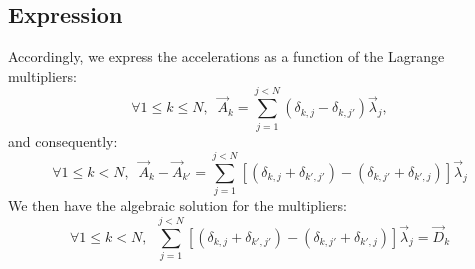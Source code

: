 \documentclass[aps,12pt]{revtex4}
\begin{document}
\subsection{Expression}
Accordingly, we express the accelerations as a function of the Lagrange multipliers:
\begin{equation}
	\forall 1\leq k \leq N, \;\; \vec{A}_k = \sum_{j=1}^{j<N} \left( \delta_{k,j} - \delta_{k,j'}\right) \vec{\lambda}_j,
\end{equation}
and consequently:
\begin{equation}
	\forall 1\leq k < N, \;\; \vec{A}_k - \vec{A}_{k'}
	= \sum_{j=1}^{j<N} \left[ 
	\left(\delta_{k,j}+\delta_{k',j'} \right) 
	- \left(\delta_{k,j'}+\delta_{k',j}\right)
	\right] \vec{\lambda}_j
\end{equation}
We then have the algebraic solution for the multipliers:
\begin{equation}
	\forall 1\leq k < N,\;\;\sum_{j=1}^{j<N} \left[ 
	\left(\delta_{k,j}+\delta_{k',j'} \right) 
	- \left(\delta_{k,j'}+\delta_{k',j}\right)
	\right] \vec{\lambda}_j = \vec{D}_k
\end{equation}
\end{document}

